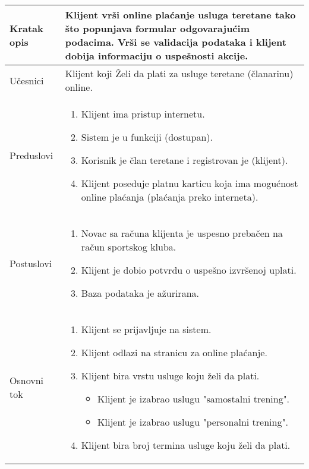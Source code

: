 \documentclass[../main.tex]{subfiles}
\begin{document}

\begin{longtable}{| p{} | p{} |} 
\hline
    Kratak opis & Klijent vrši online plaćanje usluga teretane tako što popunjava formular odgovarajućim podacima. Vrši se validacija podataka i klijent dobija informaciju o uspešnosti akcije.\\ 
\hline    
    Učesnici & Klijent koji Želi da plati za usluge teretane (članarinu) online.\\
\hline
   Preduslovi & \begin{enumerate}
       \item Klijent ima pristup internetu.
       \item Sistem je u funkciji (dostupan).
       \item Korisnik je član teretane i registrovan je (klijent).
       \item Klijent poseduje platnu karticu koja ima mogućnost online plaćanja (plaćanja preko interneta).
   \end{enumerate}\\
\hline  
    Postuslovi & \begin{enumerate}
        \item Novac sa računa klijenta je uspesno prebačen na račun sportskog kluba.
		\item Klijent je dobio potvrdu o uspešno izvršenoj uplati. %
        \item Baza podataka je ažurirana.
    \end{enumerate}\\
\hline
    Osnovni tok & \begin{enumerate}
        \item Klijent se prijavljuje na sistem.
 		\item Klijent odlazi na stranicu za online plaćanje.
 		\item Klijent bira vrstu usluge koju želi da plati.
		\begin{itemize}
			\item Klijent je izabrao uslugu "samostalni trening".
			\item Klijent je izabrao uslugu "personalni trening".
		\end{itemize}
		\item Klijent bira broj termina usluge koju želi da plati. %

\end{enumerate}
\end{longtable}
\end{document}

